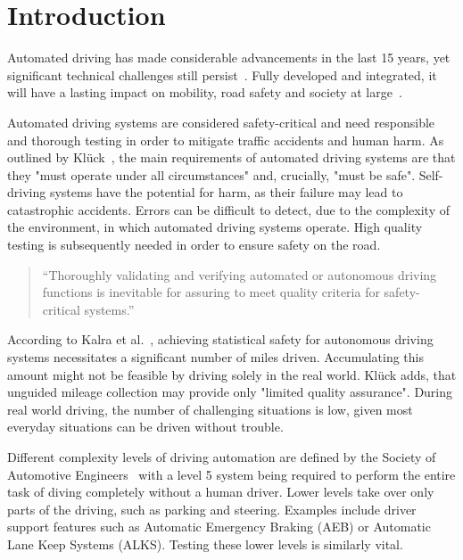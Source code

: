 \chapter{Introduction}
Automated driving has made considerable advancements in the last 15 years, yet significant technical challenges still persist~\cite{ayoub_manual_2019}.
Fully developed and integrated, it will have a lasting impact on mobility, road safety and society at large~\cite{milakis_policy_2017}.

Automated driving systems are considered safety-critical and need responsible and thorough testing in order to mitigate traffic accidents and human harm. As outlined by Klück~\cite{kluck_search-based_2022}, the main requirements of automated driving systems are that they "must operate under all circumstances" and, crucially, "must be safe". Self-driving systems have the potential for harm, as their failure may lead to catastrophic accidents. Errors can be difficult to detect, due to the complexity of the environment, in which automated driving systems operate. High quality testing is subsequently needed in order to ensure safety on the road. 

\begin{quote}
	\begin{em}
		\enquote{Thoroughly validating and verifying automated or autonomous driving functions is inevitable for assuring to meet quality criteria for safety-critical systems.}~\cite{felbinger_comparing_2019}
	\end{em}
\end{quote}

According to Kalra et al.~\cite{kalra_driving_2016}, achieving statistical safety for autonomous driving systems necessitates a significant number of miles driven. Accumulating this amount might not be feasible by driving solely in the real world. Klück \cite{kluck_search-based_2022} adds, that unguided mileage collection may provide only "limited quality assurance". During real world driving, the number of challenging situations is low, given most everyday situations can be driven without trouble.

Different complexity levels of driving automation are defined by the Society of Automotive Engineers~\cite{sae_international_sae_2021} with a level 5 system being required to perform the entire task of diving completely without a human driver. Lower levels take over only parts of the driving, such as parking and steering. Examples include driver support features such as Automatic Emergency Braking (AEB) or Automatic Lane Keep Systems (ALKS). Testing these lower levels is similarly vital.

